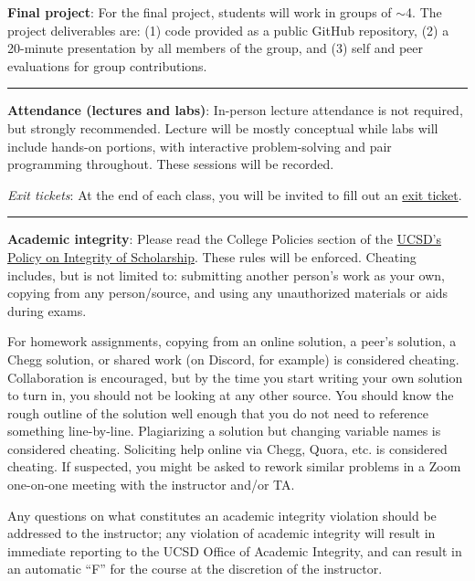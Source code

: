 \documentclass[12pt]{article}
\begin{document}
\noindent\textbf{Final project}:
For the final project, students will work in groups of $\sim$4.
The project deliverables are: (1) code provided as a public GitHub repository, (2) a 20-minute presentation by all members of the group, and (3) self and peer evaluations for group contributions.

\begin{center}
  \rule{\textwidth}{0.5pt}
\end{center}

\noindent\textbf{Attendance (lectures and labs)}: In-person lecture attendance is not required, but strongly recommended.
Lecture will be mostly conceptual while labs will include hands-on portions, with interactive problem-solving and pair programming throughout.
These sessions will be recorded.

\emph{Exit tickets}: At the end of each class, you will be invited to fill out an \href{https://forms.gle/b7ZDZRm1czrnHaGBA}{exit ticket}.

\begin{center}
  \rule{\textwidth}{0.5pt}
\end{center}

\noindent\textbf{Academic integrity}: Please read the College Policies section of the \href{http://senate.ucsd.edu/Operating-Procedures/Senate-Manual/Appendices/2}{UCSD's Policy on Integrity of Scholarship}.
These rules will be enforced.
Cheating includes, but is not limited to: submitting another person's work as your own, copying from any person/source, and using any unauthorized materials or aids during exams.

For homework assignments, copying from an online solution, a peer's solution, a Chegg solution, or shared work (on Discord, for example) is considered cheating.
Collaboration is encouraged, but by the time you start writing your own solution to turn in, you should not be looking at any other source.
You should know the rough outline of the solution well enough that you do not need to reference something line-by-line.
Plagiarizing a solution but changing variable names is considered cheating.
Soliciting help online via Chegg, Quora, etc. is considered cheating.
If suspected, you might be asked to rework similar problems in a Zoom one-on-one meeting with the instructor and/or TA.

Any questions on what constitutes an academic integrity violation should be addressed to the instructor; any violation of academic integrity will result in immediate reporting to the UCSD Office of Academic Integrity, and can result in an automatic ``F'' for the course at the discretion of the instructor.
\end{document}

